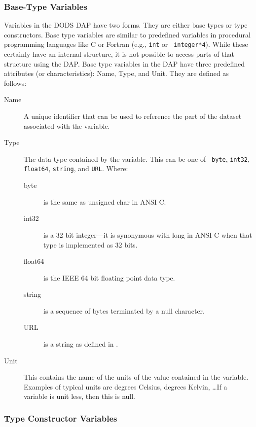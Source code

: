 \subsubsection{Base-Type Variables}
\label{base-type-variables}

Variables in the DODS DAP have two forms. They are either base types or type
constructors. Base type variables are similar to predefined variables in
procedural programming languages like C or Fortran (e.g., {\tt int} or {\tt
  integer*4}).  While these certainly have an internal structure, it is not
possible to access parts of that structure using the DAP\@. Base type
variables in the DAP have three predefined attributes (or characteristics):
Name, Type, and Unit.  They are defined as follows:

\begin{description}

\item [Name] A unique identifier that can be used to reference the part of
  the dataset associated with the variable.

\item [Type] The data type contained by the variable. This can be one of {\tt
    byte}, {\tt int32}, {\tt float64}, {\tt string}, and {\tt URL}\@.
  Where:

\begin{description}
\item [byte] is the same as unsigned char in ANSI C\@.
\item [int32] is a 32 bit integer---it is synonymous with long in
  ANSI C when that type is implemented as 32 bits.
\item [float64] is the IEEE 64 bit floating point data type.
\item [string] is a sequence of bytes terminated by a null character.
\item [URL] is a string as defined in \URL\@.
\end{description}

\item [Unit] This contains the name of the units of the value contained in
  the variable.  Examples of typical units are degrees Celsius, degrees
  Kelvin, \ldots If a variable is unit less, then this is null.

\end{description}  

\subsubsection{Type Constructor Variables} 

